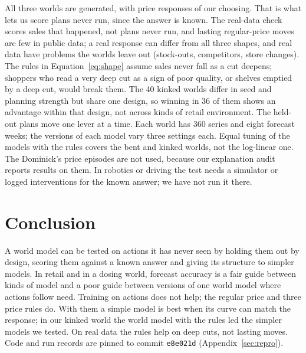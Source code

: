 All three worlds are generated, with price responses of our choosing. That is what lets us score plans never run,
since the answer is known. The real-data check scores sales that happened, not plans never run, and lasting regular-price
moves are few in public data; a real response can
differ from all three shapes, and real data have problems the worlds leave out (stock-outs, competitors, store
changes). The rules in Equation~\eqref{eq:shape} assume
sales never fall as a cut deepens; shoppers who read a very deep cut as a sign of poor quality, or shelves emptied
by a deep cut, would break them. The 40 kinked worlds differ in seed and planning strength but share one design, so
winning in 36 of them shows an advantage within that design, not across kinds of retail environment. The
held-out plans move one lever at a time. Each world has 360 series and eight forecast weeks; the versions of each
model vary three settings
each. Equal tuning of the models with the rules covers the bent and kinked worlds, not the log-linear one. The Dominick's price
episodes are not used, because our explanation audit reports results on them. In robotics or driving the test needs a simulator or
logged interventions for the known answer; we have not run it there.

\section{Conclusion}\label{sec:conclusion}

A world model can be tested on actions it has never seen by holding them out by design, scoring them against a known
answer and giving its structure to simpler models. In retail and in a dosing world, forecast accuracy is a fair guide
between kinds of model and a poor guide between versions of one world model where actions follow need. Training on
actions does not help; the regular price and three price rules do. With them a simple model is best when its
curve can match the response; in our kinked world the world model with the rules led the simpler models we tested.
On real data the rules help on deep cuts, not lasting moves.\ificwm{} Code and run records are pinned to
commit \texttt{e8e021d} (Appendix~\ref{sec:repro}).\fi

\ificwm



\appendix

\else



\appendix
\fi


